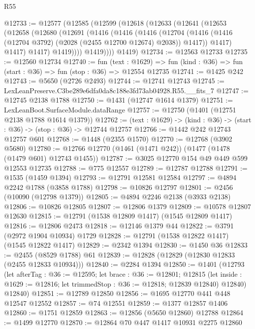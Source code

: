 \begin{lexlean}{R55}
\begin{coremodule}
{{@12733 := @12577
    (@12585
      (@12599
        (@12618
          (@12633
            (@12641
              (@12653
                (@12658
                  (@12680
                    (@12691
                      (@1416
                        (@1416
                          (@1416
                            (@12704
                              (@1416
                                (@1416 (@12704 @3792) (@2028 (@2455 @12700 @12674) @2038))
                                @1417))
                            @1417)
                          @1417)
                        @1417)
                      @1419))))
              @1419))))
      @1419)
@12734 := @12563 @12733
@12735 := @12560 @12734
@12740 := fun (text : @1629) =>
  fun (kind : @36) => fun (start : @36) => fun (stop : @36) => @12554 @12735
@12741 := @1425 @242
@12743 := @5650 (@2726 @2493)
@12744 := @12741 @12743
@12745 := LexLeanPreserve.C3be289e6dfa0da8c188e3fd73ab04928.R55.__fits_7
@12747 := @12745 @2138 @1788
@12750 := @1431 (@12747 @1614 @1379)
@12751 := LexLeanBoot.SurfaceModule.dataRange
@12757 := @12750 (@1401 (@12751 @2138 @1788 @1614 @1379))
@12762 := (text : @1629) -> (kind : @36) -> (start : @36) -> (stop : @36) -> @12744 @12757
@12766 := @1442 @242 @12743 @12757 @601
@12768 := @1448 (@2355 @1570)
@12770 := @12768 (@3902 @5680)
@12780 := @12766 @12770 (@1461 (@1471 @242)) (@1477 (@1478 (@1479 @601) @12743 @1455))
@12787 := @3025 @12770 @154 @49 @449 @599 @12553 @12735
@12788 := @775 @12557
@12789 := @12787 @12788
@12791 := @1535 (@1459 @1394)
@12793 := @12791 @12581 @12584
@12797 := @4894 @2242 @1788 (@3858 @1788)
@12798 := @10826 @12797
@12801 := @2456 (@10090 (@12798 @1379))
@12805 := @4894 @2246 @2138 (@3933 @2138)
@12806 := @10826 @12805
@12807 := @12806 @1379
@12809 := @10578 @12807 @12630
@12815 := @12791 (@1538 @12809 @1417) (@1545 @12809 @1417)
@12816 := @12806 @2473
@12818 := @12146 @1379 @44
@12822 := @3791 (@2972 @1904 @10934) @1729
@12828 := @12791 (@1538 @12822 @1417) (@1545 @12822 @1417)
@12829 := @2342 @1394
@12830 := @1450 @36
@12833 := @2455 (@8529 @1788) @61
@12839 := @12828 (@12829 (@12830 @12833 (@2455 @12833 @10934)))
@12840 := @2284 @1394
@12850 := @1401
    (@12793
      (let afterTag : @36 := @12595;
      let brace : @36 := @12801;
      @12815 (let inside : @1629 := @12816; let trimmedStop : @36 := @12818; @12839 @12840) @12840)
      @12840)
@12851 := @12789 @12850
@12856 := @1695 @12770 @441 @448 @12547 @12552
@12857 := @74 @12551
@12859 := @1377 @12857 @1406
@12860 := @1751 @12859
@12863 := @12856 (@5650 @12860) @12788
@12864 := @1499 @12770
@12870 := @12864 @70 @447 @1417 @10931 @2275 @12860
}}
\end{coremodule}
\end{lexlean}
